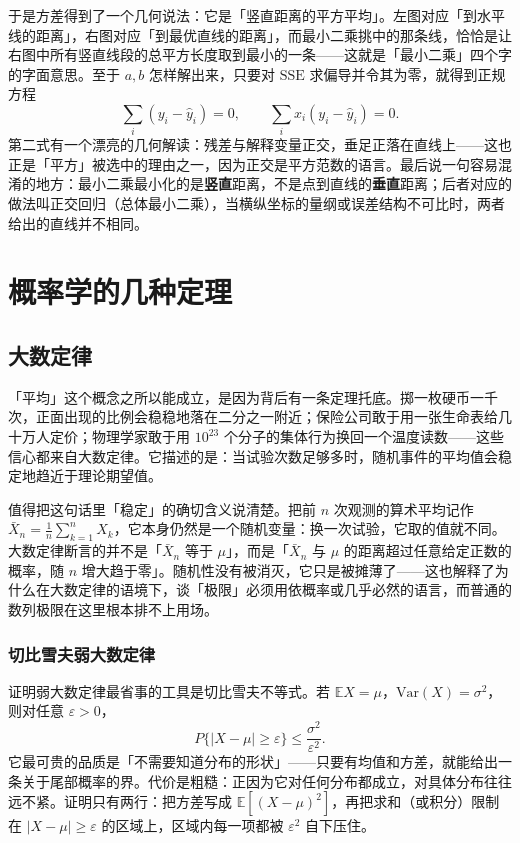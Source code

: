 \documentclass[UTF8]{ctexbook}
\begin{document}
于是方差得到了一个几何说法：它是「竖直距离的平方平均」。左图对应「到水平线的距离」，右图对应「到最优直线的距离」，而最小二乘挑中的那条线，恰恰是让右图中所有竖直线段的总平方长度取到最小的一条——这就是「最小二乘」四个字的字面意思。至于 $a,b$ 怎样解出来，只要对 $\mathrm{SSE}$ 求偏导并令其为零，就得到正规方程
\[
\sum_i (y_i-\hat y_i)=0,\qquad \sum_i x_i(y_i-\hat y_i)=0 .
\]
第二式有一个漂亮的几何解读：残差与解释变量正交，垂足正落在直线上——这也正是「平方」被选中的理由之一，因为正交是平方范数的语言。最后说一句容易混淆的地方：最小二乘最小化的是\textbf{竖直}距离，不是点到直线的\textbf{垂直}距离；后者对应的做法叫正交回归（总体最小二乘），当横纵坐标的量纲或误差结构不可比时，两者给出的直线并不相同。

\section{概率学的几种定理}

\subsection{大数定律}

「平均」这个概念之所以能成立，是因为背后有一条定理托底。掷一枚硬币一千次，正面出现的比例会稳稳地落在二分之一附近；保险公司敢于用一张生命表给几十万人定价；物理学家敢于用 $10^{23}$ 个分子的集体行为换回一个温度读数——这些信心都来自大数定律。它描述的是：当试验次数足够多时，随机事件的平均值会稳定地趋近于理论期望值。

值得把这句话里「稳定」的确切含义说清楚。把前 $n$ 次观测的算术平均记作 $\bar X_n=\frac1n\sum_{k=1}^n X_k$，它本身仍然是一个随机变量：换一次试验，它取的值就不同。大数定律断言的并不是「$\bar X_n$ 等于 $\mu$」，而是「$\bar X_n$ 与 $\mu$ 的距离超过任意给定正数的概率，随 $n$ 增大趋于零」。随机性没有被消灭，它只是被摊薄了——这也解释了为什么在大数定律的语境下，谈「极限」必须用依概率或几乎必然的语言，而普通的数列极限在这里根本排不上用场。

\subsubsection{切比雪夫弱大数定律}

证明弱大数定律最省事的工具是切比雪夫不等式。若 $\mathbb{E}X=\mu$，$\mathrm{Var}(X)=\sigma^2$，则对任意 $\varepsilon>0$，
\[
P\{|X-\mu|\ge \varepsilon\}\le \frac{\sigma^2}{\varepsilon^2}.
\]
它最可贵的品质是「不需要知道分布的形状」——只要有均值和方差，就能给出一条关于尾部概率的界。代价是粗糙：正因为它对任何分布都成立，对具体分布往往远不紧。证明只有两行：把方差写成 $\mathbb{E}[(X-\mu)^2]$，再把求和（或积分）限制在 $|X-\mu|\ge\varepsilon$ 的区域上，区域内每一项都被 $\varepsilon^2$ 自下压住。
\end{document}
